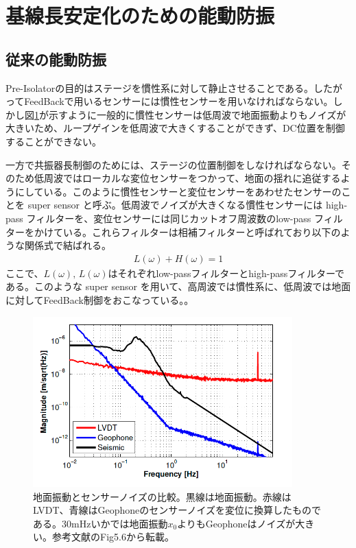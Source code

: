 \section{基線長安定化のための能動防振}
\subsection{従来の能動防振}
Pre-Isolatorの目的はステージを慣性系に対して静止させることである。したがってFeedBackで用いるセンサーには慣性センサーを用いなければならない。しかし図\ref{img:img_seismo_vs_lvdt}が示すように一般的に慣性センサーは低周波で地面振動よりもノイズが大きいため、ループゲインを低周波で大きくすることができず、DC位置を制御することができない。

一方で共振器長制御のためには、ステージの位置制御をしなければならない。そのため低周波ではローカルな変位センサーをつかって、地面の揺れに追従するようにしている。このように慣性センサーと変位センサーをあわせたセンサーのことを super sensor と呼ぶ\cite{hua2005low}。低周波でノイズが大きくなる慣性センサーには high-pass フィルターを、変位センサーには同じカットオフ周波数のlow-pass フィルターをかけている。これらフィルターは相補フィルターと呼ばれており以下のような関係式で結ばれる。
\begin{eqnarray}\label{eq:eq01}
  L(\omega) + H(\omega) = 1
\end{eqnarray}  
ここで、$L(\omega),\,L(\omega)$はそれぞれlow-passフィルターとhigh-passフィルターである。このような super sensor を用いて、高周波では慣性系に、低周波では地面に対してFeedBack制御をおこなっている。。

\begin{figure}[H]
  \begin{center}
    \includegraphics[width=10.0cm]{../arm_length_compensation_system/img_seismo_vs_lvdt.png}
  \end{center}
  \caption{地面振動とセンサーノイズの比較。黒線は地面振動。赤線はLVDT、青線はGeophoneのセンサーノイズを変位に換算したものである。30mHzいかでは地面振動$x_0$よりもGeophoneはノイズが大きい。参考文献\cite{sekiguchiD2016}のFig5.6から転載。}
  \label{img:img_seismo_vs_lvdt}
\end{figure}

